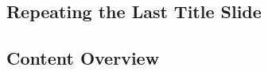 \documentclass[
	aspectratio=169, %
	8pt, %
]{beamer}
\begin{document}
\subsection{Repeating the Last Title Slide}
\againtitle

\subsection{Content Overview}
\contentoverview[3] %
\end{document}
